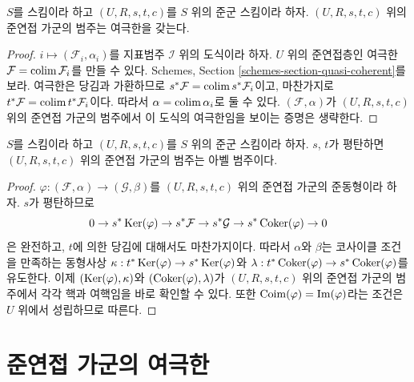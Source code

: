 \begin{lemma}
\label{lemma-colimits}
$S$를 스킴이라 하고 $(U, R, s, t, c)$를 $S$ 위의 준군 스킴이라 하자.
$(U, R, s, t, c)$ 위의 준연접 가군의 범주는 여극한을 갖는다.
\end{lemma}

\begin{proof}
$i \mapsto (\mathcal{F}_i, \alpha_i)$를 지표범주 $\mathcal{I}$ 위의 도식이라 하자. $U$ 위의 준연접층인 여극한
$\mathcal{F} = \mathop{\mathrm{colim}}\nolimits \mathcal{F}_i$를 만들 수 있다. Schemes, Section \ref{schemes-section-quasi-coherent}를 보라.
여극한은 당김과 가환하므로 $s^*\mathcal{F} = \mathop{\mathrm{colim}}\nolimits s^*\mathcal{F}_i$이고, 마찬가지로
$t^*\mathcal{F} = \mathop{\mathrm{colim}}\nolimits t^*\mathcal{F}_i$이다. 따라서 $\alpha = \mathop{\mathrm{colim}}\nolimits \alpha_i$로 둘 수 있다.
$(\mathcal{F}, \alpha)$가 $(U, R, s, t, c)$ 위의 준연접 가군의 범주에서 이 도식의 여극한임을 보이는 증명은 생략한다.
\end{proof}

\begin{lemma}
\label{lemma-abelian}
$S$를 스킴이라 하고 $(U, R, s, t, c)$를 $S$ 위의 준군 스킴이라 하자. $s$, $t$가 평탄하면
$(U, R, s, t, c)$ 위의 준연접 가군의 범주는 아벨 범주이다.
\end{lemma}

\begin{proof}
$\varphi : (\mathcal{F}, \alpha) \to (\mathcal{G}, \beta)$를 $(U, R, s, t, c)$ 위의 준연접 가군의 준동형이라 하자.
$s$가 평탄하므로
$$
0 \to s^*\mathop{\mathrm{Ker}}(\varphi)
\to s^*\mathcal{F} \to s^*\mathcal{G} \to s^*\mathop{\mathrm{Coker}}(\varphi) \to 0
$$
은 완전하고, $t$에 의한 당김에 대해서도 마찬가지이다. 따라서 $\alpha$와 $\beta$는 코사이클 조건을 만족하는 동형사상
$\kappa : t^*\mathop{\mathrm{Ker}}(\varphi) \to s^*\mathop{\mathrm{Ker}}(\varphi)$와
$\lambda : t^*\mathop{\mathrm{Coker}}(\varphi) \to s^*\mathop{\mathrm{Coker}}(\varphi)$를 유도한다. 이제 $(\mathop{\mathrm{Ker}}(\varphi), \kappa)$와
$(\mathop{\mathrm{Coker}}(\varphi), \lambda)$가 $(U, R, s, t, c)$ 위의 준연접 가군의 범주에서 각각 핵과 여핵임을 바로 확인할 수 있다.
또한 $\mathop{\mathrm{Coim}}(\varphi) = \mathop{\mathrm{Im}}(\varphi)$라는 조건은 $U$ 위에서 성립하므로 따른다.
\end{proof}













\section{준연접 가군의 여극한}
\label{section-colimits}

